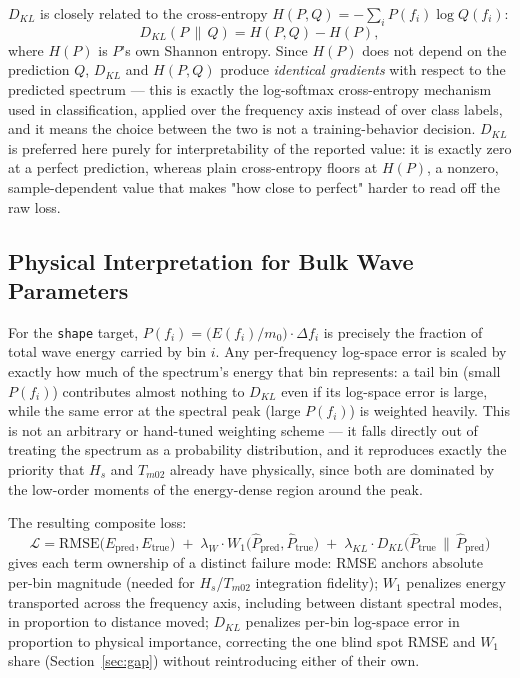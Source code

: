 \documentclass[11pt,a4paper]{article}
\begin{document}
$D_{KL}$ is closely related to the cross-entropy $H(P,Q) =
-\sum_i P(f_i)\log Q(f_i)$:
\begin{equation}
D_{KL}(P\,\|\,Q) = H(P,Q) - H(P),
\end{equation}
where $H(P)$ is $P$'s own Shannon entropy. Since $H(P)$ does not depend on
the prediction $Q$, $D_{KL}$ and $H(P,Q)$ produce \emph{identical gradients}
with respect to the predicted spectrum — this is exactly the log-softmax
cross-entropy mechanism used in classification, applied over the frequency
axis instead of over class labels, and it means the choice between the two
is not a training-behavior decision. $D_{KL}$ is preferred here purely for
interpretability of the reported value: it is exactly zero at a perfect
prediction, whereas plain cross-entropy floors at $H(P)$, a nonzero,
sample-dependent value that makes "how close to perfect" harder to read
off the raw loss.

\subsection{Physical Interpretation for Bulk Wave Parameters}

For the \texttt{shape} target, $P(f_i) = \big(E(f_i)/m_0\big)\cdot\Delta f_i$
is precisely the fraction of total wave energy carried by bin $i$. Any
per-frequency log-space error is scaled by exactly how much of the
spectrum's energy that bin represents: a tail bin (small $P(f_i)$)
contributes almost nothing to $D_{KL}$ even if its log-space error is large,
while the same error at the spectral peak (large $P(f_i)$) is weighted
heavily. This is not an arbitrary or hand-tuned weighting scheme — it falls
directly out of treating the spectrum as a probability distribution, and it
reproduces exactly the priority that $H_s$ and $T_{m02}$ already have
physically, since both are dominated by the low-order moments of the
energy-dense region around the peak.

The resulting composite loss:
\begin{equation}
\mathcal{L} = \text{RMSE}\big(E_{\text{pred}}, E_{\text{true}}\big)
\;+\; \lambda_W \cdot W_1\big(\hat P_{\text{pred}}, \hat P_{\text{true}}\big)
\;+\; \lambda_{KL} \cdot D_{KL}\big(\hat P_{\text{true}}\,\|\,\hat P_{\text{pred}}\big)
\end{equation}
gives each term ownership of a distinct failure mode: RMSE anchors absolute
per-bin magnitude (needed for $H_s$/$T_{m02}$ integration fidelity); $W_1$
penalizes energy transported across the frequency axis, including between
distant spectral modes, in proportion to distance moved; $D_{KL}$ penalizes
per-bin log-space error in proportion to physical importance, correcting
the one blind spot RMSE and $W_1$ share (Section~\ref{sec:gap}) without
reintroducing either of their own.
\end{document}
